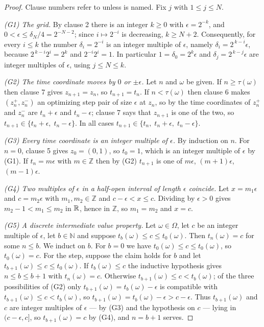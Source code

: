 \begin{proof}
Clause numbers refer to  unless  is
named. Fix $j$ with $1\le j\le N$.

\emph{(G1) The grid.} By clause 2 there is an integer $k\ge0$ with
$\epsilon=2^{-k}$, and $0<\epsilon\le\delta_N/4=2^{-N-2}$; since $i\mapsto2^{-i}$
is decreasing, $k\ge N+2$. Consequently, for every $i\le k$ the number
$\delta_i=2^{-i}$ is an integer multiple of $\epsilon$, namely
$\delta_i=2^{\,k-i}\epsilon$, because $2^{\,k-i}2^{i}=2^k$ and
$2^{-i}2^{i}=1$. In particular $1=\delta_0=2^k\epsilon$ and
$\delta_j=2^{\,k-j}\epsilon$ are integer multiples of $\epsilon$, using
$j\le N\le k$.

\emph{(G2) The time coordinate moves by $0$ or $\pm\epsilon$.} Let $n$ and
$\omega$ be given. If $n\ge\tau(\omega)$ then clause 7 gives
$z_{n+1}=z_n$, so $t_{n+1}=t_n$. If $n<\tau(\omega)$ then clause 6 makes
$(z^+_n,z^-_n)$ an optimizing step pair of size $\epsilon$ at $z_n$, so by
 the time coordinates of $z^+_n$ and $z^-_n$ are
$t_n+\epsilon$ and $t_n-\epsilon$; clause 7 says that $z_{n+1}$ is one of the
two, so $t_{n+1}\in\{t_n+\epsilon,\;t_n-\epsilon\}$. In all cases
$t_{n+1}\in\{t_n,\;t_n+\epsilon,\;t_n-\epsilon\}$.

\emph{(G3) Every time coordinate is an integer multiple of $\epsilon$.} By
induction on $n$. For $n=0$, clause 5 gives $z_0=(0,1)$, so $t_0=1$, which is an
integer multiple of $\epsilon$ by (G1). If $t_n=m\epsilon$ with $m\in\mathbb Z$
then by (G2) $t_{n+1}$ is one of $m\epsilon$, $(m+1)\epsilon$, $(m-1)\epsilon$.

\emph{(G4) Two multiples of $\epsilon$ in a half-open interval of length
$\epsilon$ coincide.} Let $x=m_1\epsilon$ and $c=m_2\epsilon$ with
$m_1,m_2\in\mathbb Z$ and $c-\epsilon<x\le c$. Dividing by $\epsilon>0$ gives
$m_2-1<m_1\le m_2$ in $\mathbb{R}$, hence in $\mathbb Z$, so $m_1=m_2$ and $x=c$.

\emph{(G5) A discrete intermediate value property.} Let $\omega\in\Omega$, let
$c$ be an integer multiple of $\epsilon$, let $b\in\mathbb N$ and suppose
$t_b(\omega)\le c\le t_0(\omega)$. Then $t_n(\omega)=c$ for some $n\le b$. We
induct on $b$. For $b=0$ we have $t_0(\omega)\le c\le t_0(\omega)$, so
$t_0(\omega)=c$. For the step, suppose the claim holds for $b$ and let
$t_{b+1}(\omega)\le c\le t_0(\omega)$. If $t_b(\omega)\le c$ the inductive
hypothesis gives $n\le b\le b+1$ with $t_n(\omega)=c$. Otherwise
$t_{b+1}(\omega)\le c<t_b(\omega)$; of the three possibilities of (G2) only
$t_{b+1}(\omega)=t_b(\omega)-\epsilon$ is compatible with
$t_{b+1}(\omega)\le c<t_b(\omega)$, so
$t_{b+1}(\omega)=t_b(\omega)-\epsilon>c-\epsilon$. Thus $t_{b+1}(\omega)$ and
$c$ are integer multiples of $\epsilon$ --- by (G3) and the hypothesis on $c$ ---
lying in $(c-\epsilon,c]$, so $t_{b+1}(\omega)=c$ by (G4), and $n=b+1$ serves.


\end{proof}
